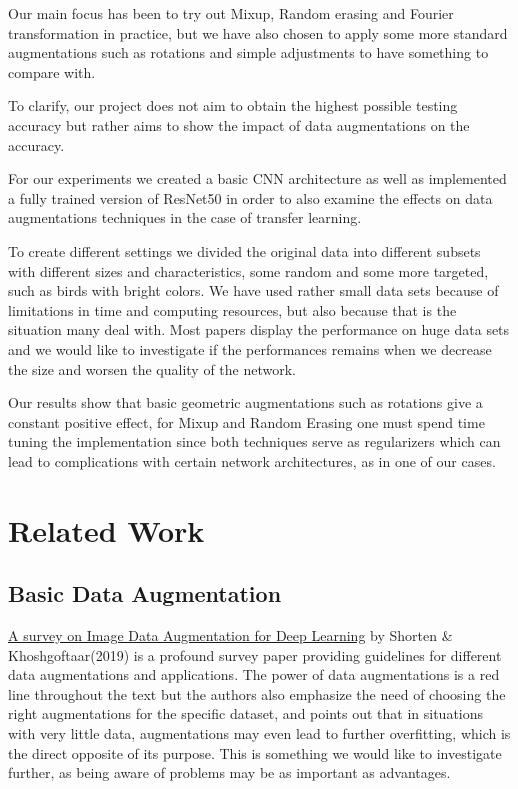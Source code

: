 \documentclass{article}
\begin{document}
Our main focus has been to try out Mixup, Random erasing and Fourier transformation in practice, but we have also chosen to apply some more standard augmentations such as rotations and simple adjustments to have something to compare with.

To clarify, our project does not aim to obtain the highest possible testing accuracy but rather aims to show the impact of data augmentations on the accuracy. 

For our experiments we created a basic CNN architecture as well as implemented a fully trained version of ResNet50 in order to also examine the effects on data augmentations techniques in the case of transfer learning.

To create different settings we divided the original data into different subsets with different sizes and characteristics, some random and some more targeted, such as birds with bright colors. We have used rather small data sets because of limitations in time and computing resources, but also because that is the situation many deal with. Most papers display the performance on huge data sets and we would like to investigate if the performances remains when we decrease the size and worsen the quality of the network.

Our results show that basic geometric augmentations such as rotations give a constant positive effect, for Mixup and Random Erasing one must spend time tuning the implementation since both techniques serve as regularizers which can lead to complications with certain network architectures, as in one of our cases. 

\section{Related Work}

\subsection{Basic Data Augmentation}

\href{https://link.springer.com/article/10.1186/s40537-019-0197-0}{A survey on Image Data Augmentation for Deep Learning} by Shorten \& Khoshgoftaar(2019) is a profound survey paper providing guidelines for different data augmentations and applications. The power of data augmentations is a red line throughout the text but the authors also emphasize the need of choosing the right augmentations for the specific dataset, and points out that in situations with very little data, augmentations may even lead to further overfitting, which is the direct opposite of its purpose. This is something we would like to investigate further, as being aware of problems may be as important as advantages.
\end{document}
